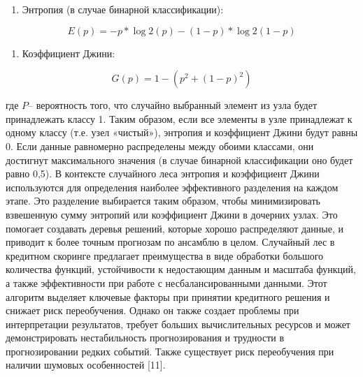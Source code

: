 \begin{enumerate}
\def\labelenumi{\arabic{enumi}.}
\item
  Энтропия (в случае бинарной классификации):
\end{enumerate}
\begin{equation}
	E(p)= - p*\log2(p)-(1-p)*\log2(1-p)
\end{equation}

\begin{enumerate}
\def\labelenumi{\arabic{enumi}.}
\setcounter{enumi}{1}
\item
  Коэффициент Джини:
\end{enumerate}

\begin{equation}
	G(p)= 1 - (p^2 + (1 - p)^2)
\end{equation}

где $P$-- вероятность того, что случайно
выбранный элемент из узла будет принадлежать классу 1. Таким образом,
если все элементы в узле принадлежат к одному классу (т.е. узел
«чистый»), энтропия и коэффициент Джини будут равны 0. Если данные
равномерно распределены между обоими классами, они достигнут
максимального значения (в случае бинарной классификации оно будет равно
0,5). В контексте случайного леса энтропия и коэффициент Джини
используются для определения наиболее эффективного разделения на каждом
этапе. Это разделение выбирается таким образом, чтобы минимизировать
взвешенную сумму энтропий или коэффициент Джини в дочерних узлах. Это
помогает создавать деревья решений, которые хорошо распределяют данные,
и приводит к более точным прогнозам по ансамблю в целом. Случайный лес в
кредитном скоринге предлагает преимущества в виде обработки большого
количества функций, устойчивости к недостающим данным и масштаба
функций, а также эффективности при работе с несбалансированными данными.
Этот алгоритм выделяет ключевые факторы при принятии кредитного решения
и снижает риск переобучения. Однако он также создает проблемы при
интерпретации результатов, требует больших вычислительных ресурсов и
может демонстрировать нестабильность прогнозирования и трудности в
прогнозировании редких событий. Также существует риск переобучения при
наличии шумовых особенностей {[}11{]}.

